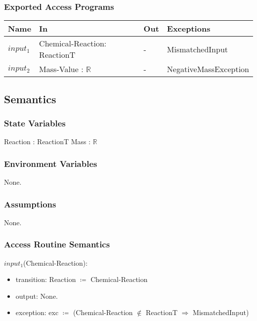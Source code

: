 \documentclass[12pt, titlepage]{article}
\begin{document}
\subsubsection{Exported Access Programs}

\begin{center}
\begin{tabular}{p{2cm} p{4cm} p{4cm} p{2cm}}
\hline
\textbf{Name} & \textbf{In} & \textbf{Out} & \textbf{Exceptions} \\
\hline
{$input_1$} & Chemical-Reaction: \newline ReactionT & - & MismatchedInput  \\
{$input_2$} & Mass-Value : $\mathbb{R}$ & - &  NegativeMassException  \\
\hline
\end{tabular}
\end{center}

\subsection{Semantics}

\subsubsection{State Variables}

Reaction : ReactionT
\newline
Mass : $\mathbb{R}$

\subsubsection{Environment Variables}

None.

\subsubsection{Assumptions}

None.

\subsubsection{Access Routine Semantics}

\noindent $input_1$(Chemical-Reaction):
\begin{itemize}
\item transition: Reaction $\coloneqq$ Chemical-Reaction
\item output:  None.
\item exception: exc $\coloneqq$ (Chemical-Reaction $\notin$ ReactionT $\Rightarrow$  MismatchedInput)
\end{itemize}
\end{document}
